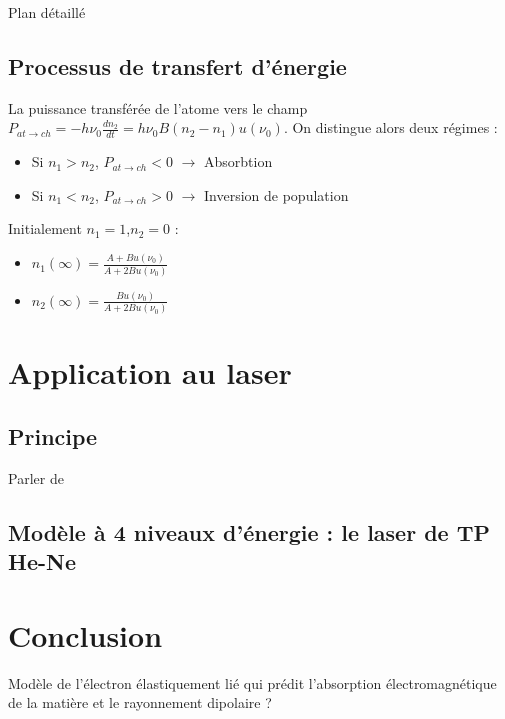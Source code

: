 \begin{reportBlock}{Plan détaillé}
\subsection{Processus de transfert d'énergie}
La puissance transférée de l'atome vers le champ $P_{at\rightarrow ch}=-h\nu_0\frac{dn_2}{dt} = h\nu_0B(n_2-n_1)u(\nu_0)$. On distingue alors deux régimes : 
\begin{itemize}
    \item Si $n_1>n_2$, $P_{at\rightarrow ch}<0$ $\longrightarrow$ Absorbtion
    \item Si $n_1<n_2$, $P_{at\rightarrow ch}>0$ $\longrightarrow$ Inversion de population
\end{itemize}

Initialement $n_1=1$,$n_2=0$ : 
\begin{itemize}
    \item $n_1(\infty) = \frac{A + Bu(\nu_0)}{A + 2Bu(\nu_0)}$
    \item $n_2(\infty) = \frac{Bu(\nu_0)}{A + 2Bu(\nu_0)}$
\end{itemize}

\section{Application au laser}
\subsection{Principe}
Parler de 

\subsection{Modèle à 4 niveaux d'énergie : le laser de TP He-Ne}


\section*{Conclusion}
Modèle de l'électron élastiquement lié qui prédit l'absorption électromagnétique de la matière et le rayonnement dipolaire ?
\end{reportBlock}



